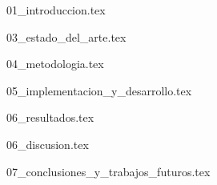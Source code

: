 \documentclass[minitoc, hidelinks, headlogo, framedcover]{tfeEPCC}
\begin{document}


\pagestyle{fancy}
\setcounter{page}{1}

{01_introduccion.tex}

{03_estado_del_arte.tex}

{04_metodologia.tex}

{05_implementacion_y_desarrollo.tex}

{06_resultados.tex}

{06_discusion.tex}

{07_conclusiones_y_trabajos_futuros.tex}
\end{document}
